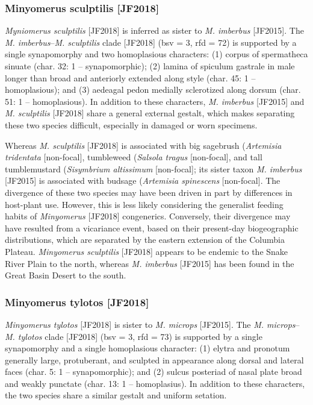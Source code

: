 \documentclass[fleqn,10pt,lineno]{wlpeerj} %
\begin{document}
		\subsubsection*{Minyomerus sculptilis \textnormal{\bfseries[JF2018]}}
			\textit{Myniomerus sculptilis} [JF2018] is inferred as sister to \textit{M. imberbus} [JF2015].
			The \textit{M. imberbus}--\textit{M. sculptilis} clade [JF2018] (bsv = 3, rfd = 72) is supported by a single synapomorphy and two homoplasious characters: (1) corpus of spermatheca sinuate (char. 32: 1 -- synapomorphic); (2) lamina of spiculum gastrale in male longer than broad and anteriorly extended along style (char. 45: 1 -- homoplasious); and (3) aedeagal pedon medially sclerotized along dorsum (char. 51: 1 -- homoplasious).
			In addition to these characters, \textit{M. imberbus} [JF2015] and \textit{M. sculptilis} [JF2018] share a general external gestalt, which makes separating these two species difficult, especially in damaged or worn specimens.
			
			Whereas \textit{M. sculptilis} [JF2018] is associated with big sagebrush (\textit{Artemisia tridentata} [non-focal], tumbleweed (\textit{Salsola tragus} [non-focal], and tall tumblemustard (\textit{Sisymbrium altissimum} [non-focal]; its sister taxon \textit{M. imberbus} [JF2015] is associated with budsage (\textit{Artemisia spinescens} [non-focal].
			The divergence of these two species may have been driven in part by differences in host-plant use.
			However, this is less likely considering the generalist feeding habits of \textit{Minyomerus} [JF2018] congenerics.
			Conversely, their divergence may have resulted from a vicariance event, based on their present-day biogeographic distributions, which are separated by the eastern extension of the Columbia Plateau.
			\textit{Minyomerus sculptilis} [JF2018] appears to be endemic to the Snake River Plain to the north, whereas \textit{M. imberbus} [JF2015] has been found in the Great Basin Desert to the south.
		
		\subsubsection*{Minyomerus tylotos \textnormal{\bfseries[JF2018]}}	
			\textit{Minyomerus tylotos} [JF2018] is sister to \textit{M. microps} [JF2015].
			The \textit{M. microps}--\textit{M. tylotos} clade [JF2018] (bsv = 3, rfd = 73) is supported by a single synapomorphy and a single homoplasious character: (1) elytra and pronotum generally large, protuberant, and sculpted in appearance along dorsal and lateral faces (char. 5: 1 -- synapomorphic); and (2) sulcus posteriad of nasal plate broad and weakly punctate (char. 13: 1 -- homoplasius).
			In addition to these characters, the two species share a similar gestalt and uniform setation.
			
\end{document}
